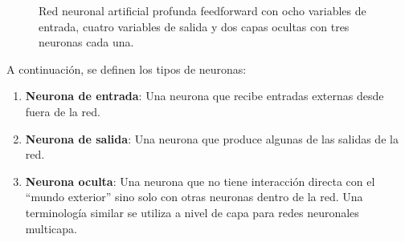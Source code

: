 \documentclass[
  us-letterpaper,
]{scrreprt}
\theoremstyle{plain}
\theoremstyle{definition}
\theoremstyle{definition}
\theoremstyle{plain}
\theoremstyle{remark}
\begin{document}
\begin{figure}


\caption{\label{fig-rnp}Red neuronal artificial profunda feedforward con
ocho variables de entrada, cuatro variables de salida y dos capas
ocultas con tres neuronas cada una.}

\end{figure}%

A continuación, se definen los tipos de neuronas:

\begin{enumerate}
\def\labelenumi{\arabic{enumi}.}
\item
  \textbf{Neurona de entrada}: Una neurona que recibe entradas externas
  desde fuera de la red.
\item
  \textbf{Neurona de salida}: Una neurona que produce algunas de las
  salidas de la red.
\item
  \textbf{Neurona oculta}: Una neurona que no tiene interacción directa
  con el ``mundo exterior'' sino solo con otras neuronas dentro de la
  red. Una terminología similar se utiliza a nivel de capa para redes
  neuronales multicapa.
\end{enumerate}
\end{document}
